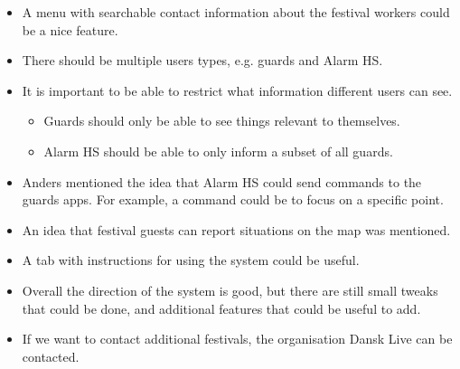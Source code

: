 \begin{itemize}
    \item A menu with searchable contact information about the festival workers could be a nice feature.
    \item There should be multiple users types, e.g. guards and Alarm HS.
    \item It is important to be able to restrict what information different users can see.
    \begin{itemize}
        \item Guards should only be able to see things relevant to themselves.
        \item Alarm HS should be able to only inform a subset of all guards.
    \end{itemize}
    \item Anders mentioned the idea that Alarm HS could send commands to the guards apps. For example, a command could be to focus on a specific point.
    \item An idea that festival guests can report situations on the map was mentioned.
    \item A tab with instructions for using the system could be useful.
    \item Overall the direction of the system is good, but there are still small tweaks that could be done, and additional features that could be useful to add.
    \item If we want to contact additional festivals, the organisation Dansk Live can be contacted.
\end{itemize}